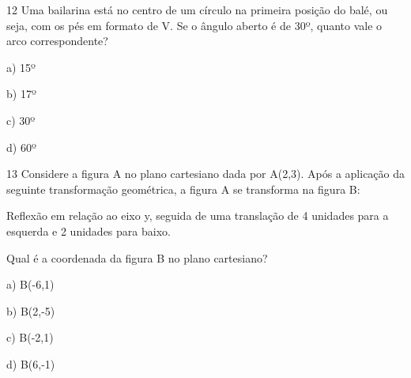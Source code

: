 
\num{12} Uma bailarina está no centro de um círculo na primeira posição do
balé, ou seja, com os pés em formato de V. Se o ângulo aberto é de 30º,
quanto vale o arco correspondente?

a) 15º

b) 17º

c) 30º

d) 60º



\num{13} Considere a figura A no plano cartesiano dada por A(2,3). Após a
aplicação da seguinte transformação geométrica, a figura A se transforma
na figura B:

Reflexão em relação ao eixo y, seguida de uma translação de 4 unidades
para a esquerda e 2 unidades para baixo.

Qual é a coordenada da figura B no plano cartesiano?

a) B(-6,1)

b) B(2,-5)

c) B(-2,1)

d) B(6,-1)



